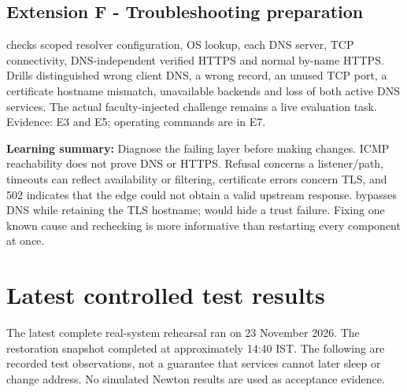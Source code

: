 \documentclass[12pt,a4paper]{article}
\newcommand{\codepath}[1]{\path{#1}}
\begin{document}
\subsection{Extension F - Troubleshooting preparation}


\codepath{phase2/diagnose.sh} checks scoped resolver configuration, OS lookup, each DNS server, TCP connectivity, DNS-independent verified HTTPS and normal by-name HTTPS. Drills distinguished wrong client DNS, a wrong record, an unused TCP port, a certificate hostname mismatch, unavailable backends and loss of both active DNS services. The actual faculty-injected challenge remains a live evaluation task. Evidence: E3 and E5; operating commands are in E7.


\textbf{Learning summary:} Diagnose the failing layer before making changes. ICMP reachability does not prove DNS or HTTPS. Refusal concerns a listener/path, timeouts can reflect availability or filtering, certificate errors concern TLS, and 502 indicates that the edge could not obtain a valid upstream response. \codepath{--resolve} bypasses DNS while retaining the TLS hostname; \codepath{-k} would hide a trust failure. Fixing one known cause and rechecking is more informative than restarting every component at once.


\section{Latest controlled test results}


The latest complete real-system rehearsal ran on 23 November 2026. The restoration snapshot completed at approximately 14:40 IST. The following are recorded test observations, not a guarantee that services cannot later sleep or change address. No simulated Newton results are used as acceptance evidence.
\end{document}
